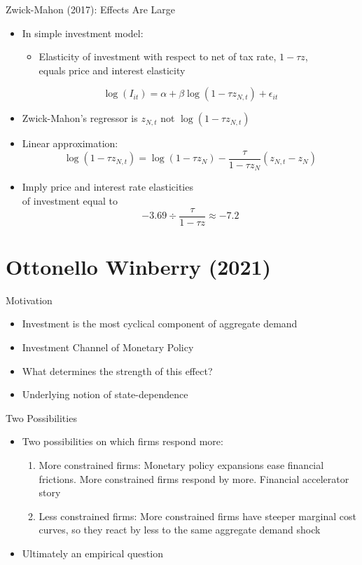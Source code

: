 \documentclass[english,xcolor=svgnames,aspectratio=169]{beamer}
\begin{document}
\begin{frame}{Zwick-Mahon (2017): Effects Are Large}
\begin{itemize}
	\itemsep1em 
	\item In simple investment model:
	\begin{itemize}
		\item Elasticity of investment with respect to net of tax rate, $1-\tau z$, \\ equals price and interest elasticity
	\end{itemize}
	\[ \log (I_{it}) = \alpha + \beta \log(1-\tau z_{N,t}) + \epsilon_{it} \]
	\item Zwick-Mahon's regressor is $z_{N,t}$ not $\log(1-\tau z_{N,t})$
	\item Linear approximation:
	\[ \log(1-\tau z_{N,t}) =  \log(1-\tau z_{N}) - \frac{\tau}{1-\tau z_{N}} (z_{N,t} - z_N)  \] 
	\item Imply price and interest rate elasticities \\ of investment equal to
	\[- 3.69 \div \frac{\tau}{1-\tau z} \approx -7.2 \] 
\end{itemize}
\end{frame}

\section{Ottonello Winberry (2021)}

\begin{frame}{Motivation}
\begin{itemize}
\item Investment is the most cyclical component of aggregate demand
\item Investment Channel of Monetary Policy
\item What determines the strength of this effect?
\item Underlying notion of state-dependence
\end{itemize}
\end{frame}

\begin{frame}{Two Possibilities}
\begin{itemize}
\item Two possibilities on which firms respond more:
\begin{enumerate}
\item More constrained firms: Monetary policy expansions ease financial frictions. More constrained firms respond by more. Financial accelerator story
\item Less constrained firms: More constrained firms have steeper marginal cost curves, so they react by less to the same aggregate demand shock
\end{enumerate}
\item Ultimately an empirical question
\end{itemize}
\end{frame}
\end{document}
